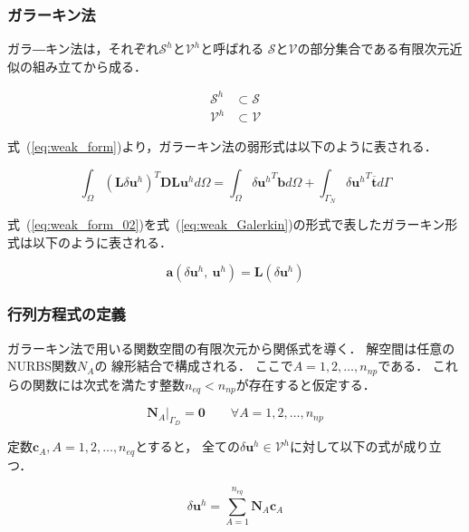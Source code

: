 \subsubsection{ガラーキン法}
ガラ―キン法は，それぞれ$\mathcal{S}^h$と$\mathcal{V}^h$と呼ばれる
$\mathcal{S}$と$\mathcal{V}$の部分集合である有限次元近似の組み立てから成る．

\begin{align}
  \mathcal{S}^h&\subset\mathcal{S}\\
  \mathcal{V}^h&\subset\mathcal{V}
\end{align}

\noindent
式~(\ref{eq:weak_form})より，ガラーキン法の弱形式は以下のように表される．

\begin{equation}
  \label{eq:weak_form_02}
  \int_\Omega (\boldsymbol{L}\delta\boldsymbol{u}^{h})^T \boldsymbol{D}\boldsymbol{L}\boldsymbol{u}^{h} d\Omega = \int_\Omega \delta{\boldsymbol{u}^{h}}^{T} \boldsymbol{b} d\Omega + \int_{\Gamma_N} \delta{\boldsymbol{u}^{h}}^{T} \overline{\boldsymbol{t}} d\Gamma
\end{equation}

\noindent
式~(\ref{eq:weak_form_02})を式~(\ref{eq:weak_Galerkin})の形式で表したガラーキン形式は以下のように表される．

\begin{equation}
  \label{eq:Galerkin}
  \boldsymbol{a}(\delta\boldsymbol{u}^h,\ \boldsymbol{u}^h)=\boldsymbol{L}(\delta\boldsymbol{u}^h)
\end{equation}

\subsubsection{行列方程式の定義}

ガラーキン法で用いる関数空間の有限次元から関係式を導く．
解空間は任意のNURBS関数$N_A$の
線形結合で構成される．
ここで$A=1,2,\dots,n_{np}$である．
これらの関数には次式を満たす整数$n_{eq}<n_{np}$が存在すると仮定する．

\begin{equation}
  {\boldsymbol{N}_A|}_{\Gamma_D}=\boldsymbol{0}\qquad\forall A=1,2,\dots,n_{np}
\end{equation}

\noindent
定数$\boldsymbol{c}_A,A=1,2,\dots,n_{eq}$とすると，
全ての$\delta\boldsymbol{u}^h\in\mathcal{V}^h$に対して以下の式が成り立つ．

\begin{equation}
  \label{eq:delta u_vec}
  \delta\boldsymbol{u}^h=\sum^{n_{eq}}_{A=1}\boldsymbol{N}_A \boldsymbol{c}_A
\end{equation}

